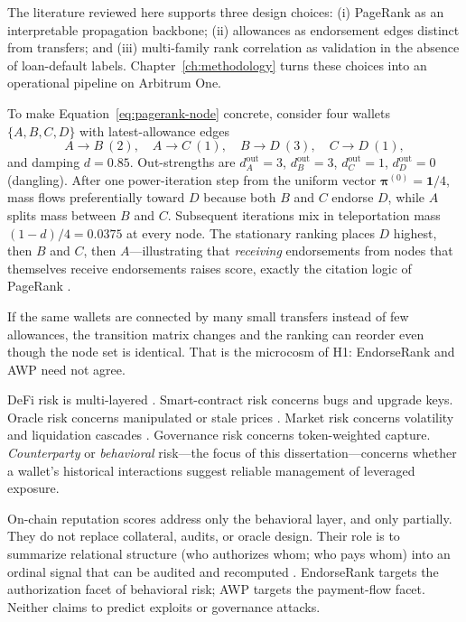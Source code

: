 The literature reviewed here supports three design choices: (i) PageRank as an interpretable propagation backbone; (ii) allowances as endorsement edges distinct from transfers; and (iii) multi-family rank correlation as validation in the absence of loan-default labels. Chapter~\ref{ch:methodology} turns these choices into an operational pipeline on Arbitrum One.


To make Equation~\eqref{eq:pagerank-node} concrete, consider four wallets $\{A,B,C,D\}$ with latest-allowance edges
\[
A\to B\ (2),\quad A\to C\ (1),\quad B\to D\ (3),\quad C\to D\ (1),
\]
and damping $d=0.85$. Out-strengths are $d_A^{\mathrm{out}}=3$, $d_B^{\mathrm{out}}=3$, $d_C^{\mathrm{out}}=1$, $d_D^{\mathrm{out}}=0$ (dangling). After one power-iteration step from the uniform vector $\boldsymbol{\pi}^{(0)}=\mathbf{1}/4$, mass flows preferentially toward $D$ because both $B$ and $C$ endorse $D$, while $A$ splits mass between $B$ and $C$. Subsequent iterations mix in teleportation mass $(1-d)/4=0.0375$ at every node. The stationary ranking places $D$ highest, then $B$ and $C$, then $A$---illustrating that \emph{receiving} endorsements from nodes that themselves receive endorsements raises score, exactly the citation logic of PageRank .

If the same wallets are connected by many small transfers instead of few allowances, the transition matrix changes and the ranking can reorder even though the node set is identical. That is the microcosm of H1: EndorseRank and AWP need not agree.


DeFi risk is multi-layered . Smart-contract risk concerns bugs and upgrade keys. Oracle risk concerns manipulated or stale prices . Market risk concerns volatility and liquidation cascades . Governance risk concerns token-weighted capture. \emph{Counterparty} or \emph{behavioral} risk---the focus of this dissertation---concerns whether a wallet's historical interactions suggest reliable management of leveraged exposure.

On-chain reputation scores address only the behavioral layer, and only partially. They do not replace collateral, audits, or oracle design. Their role is to summarize relational structure (who authorizes whom; who pays whom) into an ordinal signal that can be audited and recomputed . EndorseRank targets the authorization facet of behavioral risk; AWP targets the payment-flow facet. Neither claims to predict exploits or governance attacks.

